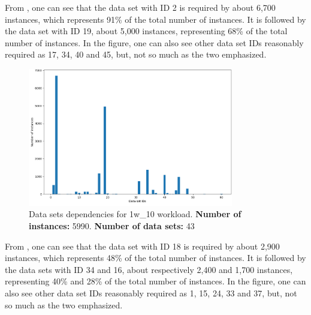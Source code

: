 From , one can see that the data set with ID 2 is required by about 6,700 instances, which represents 91\% of the total number of instances. It is followed by the data set with ID 19, about 5,000 instances, representing 68\% of the total number of instances. In the figure, one can also see other data set IDs reasonably required as 17, 34, 40 and 45, but, not so much as the two emphasized. \\

\begin{figure} [H]
    \centering
    \includegraphics[width=0.8\textwidth]{images/experiments/datasets/1w_03-05-2019_data_sets_dependencies.png}
    \captionsetup{justification=centering,margin=3cm}
    \caption{Data sets dependencies for 1w\_10 workload. \textbf{Number of instances:} 5990. \textbf{Number of data sets:} 43}
    \label{fig:datasets-dependencies-1w_10}
\end{figure}

From , one can see that the data set with ID 18 is required by about 2,900 instances, which represents 48\% of the total number of instances. It is followed by the data sets with ID 34 and 16, about respectively 2,400 and 1,700 instances, representing 40\% and 28\% of the total number of instances. In the figure, one can also see other data set IDs reasonably required as 1, 15, 24, 33 and 37, but, not so much as the two emphasized. \\

